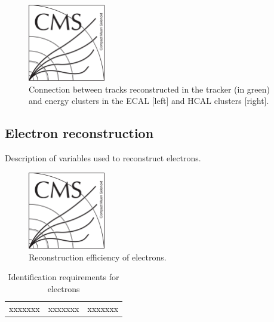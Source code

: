 \begin{figure}[!Hhtbp]
  \begin{center}
    \includegraphics[width=0.3\textwidth]{figs/CMSlogo.png}
    \caption{Connection between tracks reconstructed in the tracker (in green) and energy clusters in the ECAL [left] and HCAL clusters [right].}
    \label{fig:SubdetConec}
  \end{center}
\end{figure}
%

\subsection{Electron reconstruction}

Description of variables used to reconstruct electrons.

\begin{figure}[!Hhtbp]
  \begin{center}
    \includegraphics[width=0.3\textwidth]{figs/CMSlogo.png}
    \caption{Reconstruction efficiency of electrons.}
    \label{fig:EleEff}
  \end{center}
\end{figure}

\begin{table}[htbH]
\label{tab:ElectronParam}
\begin{center}
\begin{tabular}{|c|c|c|}
xxxxxxx & xxxxxxx & xxxxxxx
\end{tabular}
\caption{Identification requirements for electrons}
\end{center}
\end{table}

